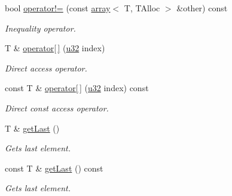 \begin{DoxyCompactItemize}
\mbox{\label{classirr_1_1core_1_1array_a7177f0d74f839a3f26df8eedcdfc4391}} 
bool \hyperlink{classirr_1_1core_1_1array_a7177f0d74f839a3f26df8eedcdfc4391}{operator!=} (const \hyperlink{classirr_1_1core_1_1array}{array}$<$ T, T\+Alloc $>$ \&other) const
\begin{DoxyCompactList}\small\item\em Inequality operator. \end{DoxyCompactList}\item 
\mbox{\label{classirr_1_1core_1_1array_a1e09dc5cc93e88fd3a37cad011b3b531}} 
T \& \hyperlink{classirr_1_1core_1_1array_a1e09dc5cc93e88fd3a37cad011b3b531}{operator\mbox{[}$\,$\mbox{]}} (\hyperlink{namespaceirr_a0416a53257075833e7002efd0a18e804}{u32} index)
\begin{DoxyCompactList}\small\item\em Direct access operator. \end{DoxyCompactList}\item 
\mbox{\label{classirr_1_1core_1_1array_aa3f3c984a95034950f1005f016ad0fb8}} 
const T \& \hyperlink{classirr_1_1core_1_1array_aa3f3c984a95034950f1005f016ad0fb8}{operator\mbox{[}$\,$\mbox{]}} (\hyperlink{namespaceirr_a0416a53257075833e7002efd0a18e804}{u32} index) const
\begin{DoxyCompactList}\small\item\em Direct const access operator. \end{DoxyCompactList}\item 
\mbox{\label{classirr_1_1core_1_1array_ad87dc5db8bf6ec1033c945a0d3724e09}} 
T \& \hyperlink{classirr_1_1core_1_1array_ad87dc5db8bf6ec1033c945a0d3724e09}{get\+Last} ()
\begin{DoxyCompactList}\small\item\em Gets last element. \end{DoxyCompactList}\item 
\mbox{\label{classirr_1_1core_1_1array_a6cc770ec657432983b7245b2b2473f42}} 
const T \& \hyperlink{classirr_1_1core_1_1array_a6cc770ec657432983b7245b2b2473f42}{get\+Last} () const
\begin{DoxyCompactList}\small\item\em Gets last element. \end{DoxyCompactList}\item 

\end{DoxyCompactItemize}
